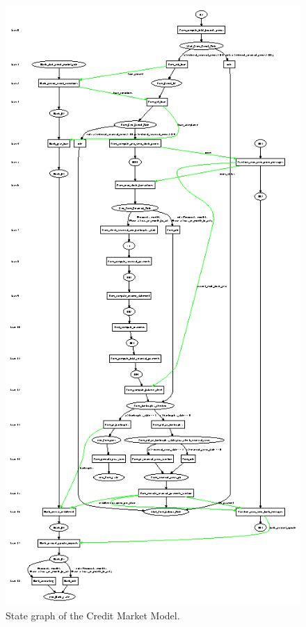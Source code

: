  \begin{figure}[!htb]
 \begin{center}
  \includegraphics*[scale=2.0]{stategraph.ps}
 \caption{State graph of the Credit Market Model.} \label{fig:statecredit}
 \end{center}
 \end{figure}